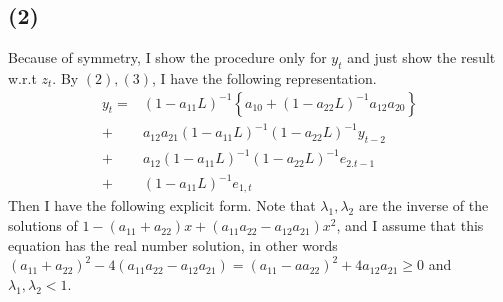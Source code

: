 \documentclass{article}
\begin{document}
\subsection{(2)}
 Because of symmetry, I show the procedure only for $y_t$ and just show the result w.r.t $z_t$. By $(2),(3)$, I have the following representation.
\begin{align*}
	y_t = &(1-a_{11}L)^{-1}\left\{ a_{10}+(1-a_{22}L)^{-1} a_{12}a_{20} \right\} \\
	+ &a_{12}a_{21}(1-a_{11}L)^{-1}(1-a_{22}L)^{-1}y_{t-2} \\
	+ &a_{12}(1-a_{11}{L})^{-1}(1-a_{22}L)^{-1}e_{2.t-1}\\
	+ &(1-a_{11}L)^{-1}e_{1,t}
\end{align*}
Then I have the following explicit form. Note that $\lambda_1, \lambda_2$ are the inverse of the solutions of $1-(a_{11} + a_{22})x + (a_{11}a_{22} - a_{12}a_{21})x^2$, and I assume that this equation has the real number solution, in other words $(a_{11} +a_{22})^2 -4(a_{11}a_{22} - a_{12}a_{21}) = (a_{11} -aa_{22})^2 + 4a_{12}a_{21} \geq 0$ and $\lambda_1, \lambda_2 < 1$.
\end{document}
